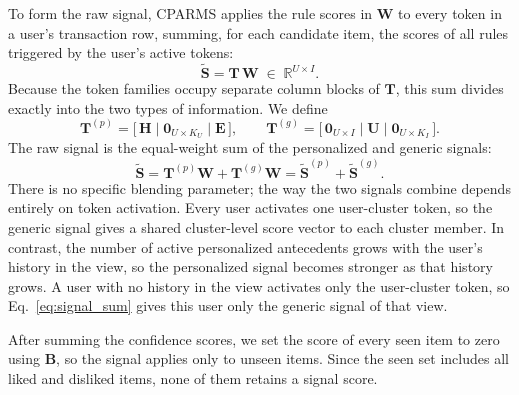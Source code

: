 \documentclass[pdflatex,sn-vancouver-num]{sn-jnl}%
\theoremstyle{thmstyleone}%
\theoremstyle{thmstyletwo}%
\theoremstyle{thmstylethree}%
\begin{document}
To form the raw signal, CPARMS applies the rule scores in $\mathbf{W}$ to every token in a user's transaction row, summing, for each candidate item, the scores of all rules triggered by the user's active tokens:
\begin{equation}
\tilde{\mathbf{S}} = \mathbf{T}\,\mathbf{W} \;\in\; \mathbb{R}^{U \times I}.
\label{eq:signal_raw}
\end{equation}
Because the token families occupy separate column blocks of $\mathbf{T}$, this sum divides exactly into the two types of information. We define
\begin{equation}
\mathbf{T}^{(p)} = \big[\, \mathbf{H} \;\big|\; \mathbf{0}_{U\times K_U} \;\big|\; \mathbf{E} \,\big],
\qquad
\mathbf{T}^{(g)} = \big[\, \mathbf{0}_{U\times I} \;\big|\; \mathbf{U} \;\big|\; \mathbf{0}_{U\times K_I} \,\big].
\end{equation}
The raw signal is the equal-weight sum of the personalized and generic signals:
\begin{equation}
\tilde{\mathbf{S}}
= \mathbf{T}^{(p)}\mathbf{W} + \mathbf{T}^{(g)}\mathbf{W}
= \tilde{\mathbf{S}}^{(p)} + \tilde{\mathbf{S}}^{(g)} .
\label{eq:signal_sum}
\end{equation}
There is no specific blending parameter; the way the two signals combine depends entirely on token activation. Every user activates one user-cluster token, so the generic signal gives a shared cluster-level score vector to each cluster member. In contrast, the number of active personalized antecedents grows with the user's history in the view, so the personalized signal becomes stronger as that history grows. A user with no history in the view activates only the user-cluster token, so Eq.~\eqref{eq:signal_sum} gives this user only the generic signal of that view.

After summing the confidence scores, we set the score of every seen item to zero using $\mathbf{B}$, so the signal applies only to unseen items. Since the seen set includes all liked and disliked items, none of them retains a signal score.
\end{document}
